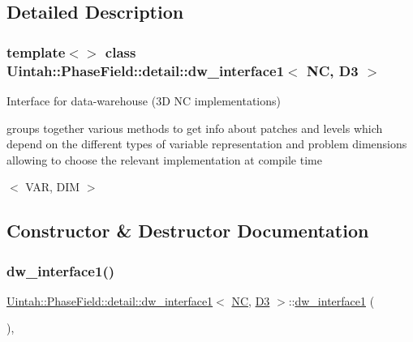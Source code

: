 \subsection{Detailed Description}
\subsubsection*{template$<$$>$\newline
class Uintah\+::\+Phase\+Field\+::detail\+::dw\+\_\+interface1$<$ N\+C, D3 $>$}

Interface for data-\/warehouse (3D NC implementations) 

groups together various methods to get info about patches and levels which depend on the different types of variable representation and problem dimensions allowing to choose the relevant implementation at compile time

$<$ V\+AR, D\+IM $>$ 

\subsection{Constructor \& Destructor Documentation}
\mbox{\label{classUintah_1_1PhaseField_1_1detail_1_1dw__interface1_3_01NC_00_01D3_01_4_a594c4528076c7034d19af0a245ae8b76}} 
\subsubsection{\texorpdfstring{dw\+\_\+interface1()}{dw\_interface1()}\hspace{0.1cm}{\footnotesize\ttfamily [1/2]}}
{\footnotesize\ttfamily \hyperlink{classUintah_1_1PhaseField_1_1detail_1_1dw__interface1}{Uintah\+::\+Phase\+Field\+::detail\+::dw\+\_\+interface1}$<$ \hyperlink{namespaceUintah_1_1PhaseField_a33d355affda78a83f45755ba8388cedda77924170fe82bfd58b74ca3e44139718}{NC}, \hyperlink{namespaceUintah_1_1PhaseField_a12bfc68444894dffdf0cb8d9cf0cc76aa72fd61934c7ca788c49ad90629f76e78}{D3} $>$\+::\hyperlink{classUintah_1_1PhaseField_1_1detail_1_1dw__interface1}{dw\+\_\+interface1} (\begin{DoxyParamCaption}{ }\end{DoxyParamCaption})\hspace{0.3cm}{\ttfamily [protected]}, {\ttfamily [delete]}}



